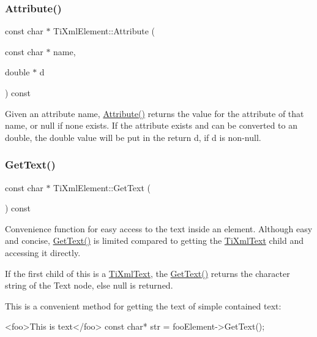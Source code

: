 \subsubsection{\texorpdfstring{Attribute()}{Attribute()}\hspace{0.1cm}{\footnotesize\ttfamily [3/3]}}
{\footnotesize\ttfamily const char $\ast$ Ti\+Xml\+Element\+::\+Attribute (\begin{DoxyParamCaption}\item[{const char $\ast$}]{name,  }\item[{double $\ast$}]{d }\end{DoxyParamCaption}) const}

Given an attribute name, \hyperlink{class_ti_xml_element_a6042f518748f475a7ac4b4e0b509eb05}{Attribute()} returns the value for the attribute of that name, or null if none exists. If the attribute exists and can be converted to an double, the double value will be put in the return \textquotesingle{}d\textquotesingle{}, if \textquotesingle{}d\textquotesingle{} is non-\/null. \hypertarget{class_ti_xml_element_af0f814ecbd43d50d4cdbdf4354d3da39}{}\label{class_ti_xml_element_af0f814ecbd43d50d4cdbdf4354d3da39} 
\subsubsection{\texorpdfstring{Get\+Text()}{GetText()}}
{\footnotesize\ttfamily const char $\ast$ Ti\+Xml\+Element\+::\+Get\+Text (\begin{DoxyParamCaption}{ }\end{DoxyParamCaption}) const}

Convenience function for easy access to the text inside an element. Although easy and concise, \hyperlink{class_ti_xml_element_af0f814ecbd43d50d4cdbdf4354d3da39}{Get\+Text()} is limited compared to getting the \hyperlink{class_ti_xml_text}{Ti\+Xml\+Text} child and accessing it directly.

If the first child of \textquotesingle{}this\textquotesingle{} is a \hyperlink{class_ti_xml_text}{Ti\+Xml\+Text}, the \hyperlink{class_ti_xml_element_af0f814ecbd43d50d4cdbdf4354d3da39}{Get\+Text()} returns the character string of the Text node, else null is returned.

This is a convenient method for getting the text of simple contained text\+: \begin{DoxyVerb}<foo>This is text</foo>
const char* str = fooElement->GetText();
\end{DoxyVerb}


